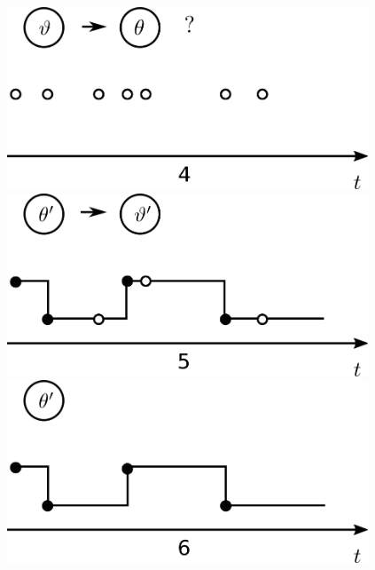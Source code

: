 \begin{figure}[h!]
\begin{minipage}[hp]{0.32\linewidth}
    \vspace{-0 in}
  \end{minipage}
  \begin{minipage}[hp]{0.32\linewidth}
  \centering
    \includegraphics [width=0.96\textwidth, angle=0]{figs/plot3.png}
    \vspace{-0 in}
  \end{minipage}
  \begin{minipage}[hp]{0.32\linewidth}
  \centering
    \includegraphics [width=0.96\textwidth, angle=0]{figs/plot5.png}
    \vspace{-0 in}
  \end{minipage}
  \begin{minipage}[hp]{0.32\linewidth}
  \centering
    \includegraphics [width=0.96\textwidth, angle=0]{figs/plot6.png}

\end{minipage}
\end{figure}
